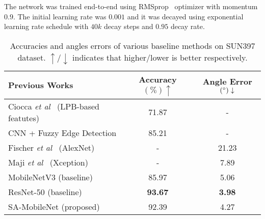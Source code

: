 \documentclass{bmvc2k}
\def\etal{\emph{et al}\bmvaOneDot}
\begin{document}
The network was trained end-to-end using RMSprop~\cite{rms} optimizer with momentum $0.9$. The initial learning rate was $0.001$ and it was decayed using exponential learning rate schedule with $40k$ decay steps and $0.95$ decay rate.
\begin{table}
\begin{center}
\begin{tabular}{|l|c|c|}
    \hline
    \textbf{Previous Works} & \textbf{Accuracy} $(\%) \uparrow$ & \textbf{Angle Error} $(\degree) \downarrow$ \\
    \hline
    Ciocca \etal ~\cite{ciocca2015lpb} (LPB-based featutes) & 71.87 & - \\ \hline 
    CNN + Fuzzy Edge Detection & 85.21 & - \\ \hline
    Fischer \etal ~\cite{orientfisher} (AlexNet) & - & 21.23 \\ \hline
    Maji \etal ~\cite{maji2020deep} (Xception) & - & 7.89 \\ \hline 
    MobileNetV3 (baseline) & 85.97 & 5.06 \\ \hline
    ResNet-50 (baseline) & \textbf{93.67} & \textbf{3.98} \\ \hline
    SA-MobileNet (proposed) & 92.39 & 4.27 \\ \hline
\end{tabular}
\caption{Accuracies and angles errors of various baseline methods on SUN397 dataset. $\uparrow/\downarrow$ indicates that higher/lower is better respectively.}
\label{tab:previousworks}
\end{center}
\end{table}
\end{document}
